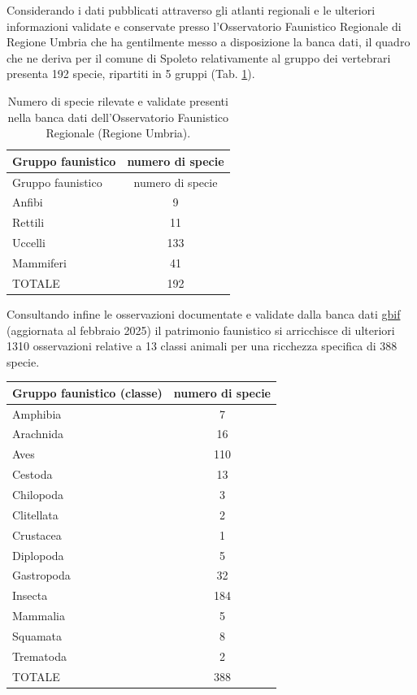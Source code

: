 \documentclass[
]{book}
\begin{document}
Considerando i dati pubblicati attraverso gli atlanti regionali e le ulteriori informazioni validate e conservate presso l'Osservatorio Faunistico Regionale di Regione Umbria che ha gentilmente messo a disposizione la banca dati, il quadro che ne deriva per il comune di Spoleto relativamente al gruppo dei vertebrari presenta 192 specie, ripartiti in 5 gruppi (Tab. \ref{tab:ofr}).

\begin{longtable}[]{@{}lc@{}}
\caption{\label{tab:ofr} Numero di specie rilevate e validate presenti nella banca dati dell'Osservatorio Faunistico Regionale (Regione Umbria).}\tabularnewline
\toprule\noalign{}
Gruppo faunistico & numero di specie \\
\midrule\noalign{}
\endfirsthead
\toprule\noalign{}
Gruppo faunistico & numero di specie \\
\midrule\noalign{}
\endhead
\bottomrule\noalign{}
\endlastfoot
Anfibi & 9 \\
Rettili & 11 \\
Uccelli & 133 \\
Mammiferi & 41 \\
TOTALE & 192 \\
\end{longtable}

Consultando infine le osservazioni documentate e validate dalla banca dati \href{https://www.gbif.org}{gbif} (aggiornata al febbraio 2025) il patrimonio faunistico si arricchisce di ulteriori 1310 osservazioni relative a 13 classi animali per una ricchezza specifica di 388 specie.

\begin{longtable}[]{@{}lc@{}}
\toprule\noalign{}
Gruppo faunistico (classe) & numero di specie \\
\midrule\noalign{}
\endhead
\bottomrule\noalign{}
\endlastfoot
Amphibia & 7 \\
Arachnida & 16 \\
Aves & 110 \\
Cestoda & 13 \\
Chilopoda & 3 \\
Clitellata & 2 \\
Crustacea & 1 \\
Diplopoda & 5 \\
Gastropoda & 32 \\
Insecta & 184 \\
Mammalia & 5 \\
Squamata & 8 \\
Trematoda & 2 \\
TOTALE & 388 \\
\end{longtable}
\end{document}
